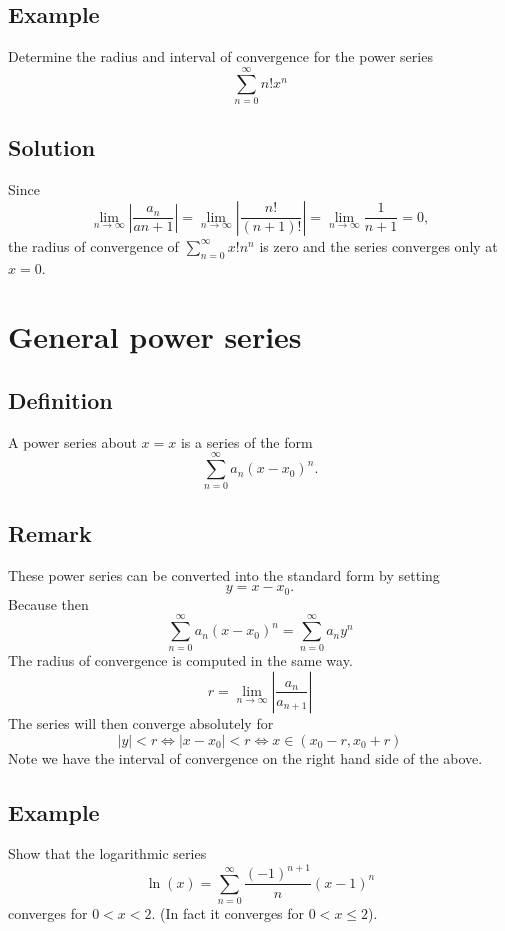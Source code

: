 \documentclass[11pt]{article}
\begin{document}
\subsection{Example}
Determine the radius and interval of convergence for the power series 
\[ \sum_{n=0}^\infty n!x^n \]

\subsection{Solution}
Since
\[ \lim_{n\rightarrow\infty} \left| \frac{a_n}{a{n+1}} \right| = \lim_{n\rightarrow\infty} \left| \frac{n!}{(n+1)!} \right| = \lim_{n\rightarrow\infty} \frac{1}{n+1} = 0, \]
the radius of convergence of $\displaystyle{\sum_{n=0}^\infty} x!n^n$ is zero and the series converges only at $x=0$.

\section{General power series}
\subsection{Definition}
A power series about $x=x$ is a series of the form
\[ \sum_{n=0}^\infty a_n(x-x_0)^n.\]
\subsection{Remark}
These power series can be converted into the standard form by setting
\[ y=x-x_0. \]
Because then
\[ \sum_{n=0}^\infty a_n(x-x_0)^n = \sum_{n=0}^\infty a_n y^n \]
The radius of convergence is computed in the same way.
\[ r = \lim_{n\rightarrow\infty} \left| \frac{a_n}{a_{n+1}} \right| \]
The series will then converge absolutely for
\[ |y| < r \Leftrightarrow |x-x_0| < r \Leftrightarrow x\in (x_0 - r, x_0 + r) \]
Note we have the interval of convergence on the right hand side of the above.

\subsection{Example}
Show that the logarithmic series
\[ \ln(x) = \sum_{n=0}^\infty \frac{(-1)^{n+1}}{n} (x-1)^n \]
converges for $0 < x < 2$. (In fact it converges for $0 < x \leq 2$).
\end{document}
